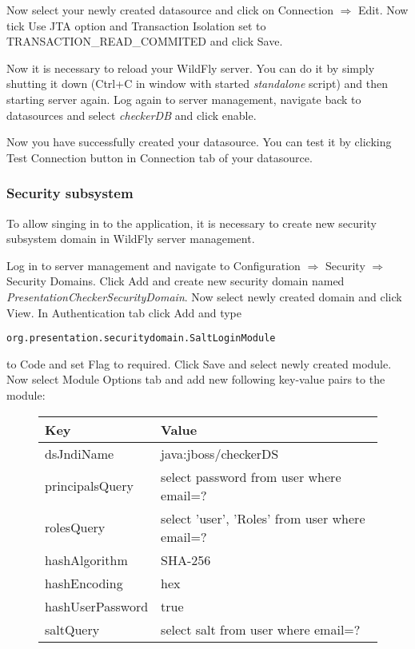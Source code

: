 \documentclass[12pt,a4paper]{article}
\begin{document}
Now select your newly created datasource and click on Connection $\Rightarrow$ Edit. Now tick Use JTA option and Transaction Isolation set to \\TRANSACTION\_READ\_COMMITED and click Save.

Now it is necessary to reload your WildFly server. You can do it by simply shutting it down (Ctrl+C in window with started \textit{standalone} script) and then starting server again. Log again to server management, navigate back to datasources and select \textit{checkerDB} and click enable.

Now you have successfully created your datasource. You can test it by clicking Test Connection button in Connection tab of your datasource.

\subsubsection{Security subsystem}
To allow singing in to the application, it is necessary to create new security subsystem domain in WildFly server management.

Log in to server management and navigate to Configuration $\Rightarrow$ Security $\Rightarrow$ Security Domains. Click Add and create new security domain named \textit{PresentationCheckerSecurityDomain}. Now select newly created domain and click View. In Authentication tab click Add and type
\begin{lstlisting}
org.presentation.securitydomain.SaltLoginModule
\end{lstlisting}
to Code and set Flag to required. Click Save and select newly created module. Now select Module Options tab and add new following key-value pairs to the module:
\begin{figure}[htbp]
\centering
\begin{tabular}{| l | l |}
\hline
Key & Value \\
\hline
dsJndiName & java:jboss/checkerDS \\
principalsQuery & select password from user where email=? \\
rolesQuery & select 'user', 'Roles' from user where email=? \\
hashAlgorithm & SHA-256 \\
hashEncoding & hex \\
hashUserPassword & true \\
saltQuery & select salt from user where email=? \\
\hline
\end{tabular}
\end{figure}
\end{document}
